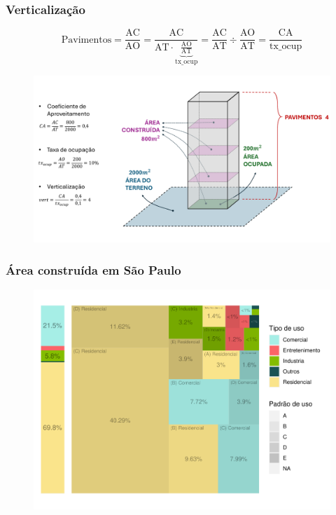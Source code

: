 \documentclass[%
    9pt, 
    aspectratio=169,
]{beamer}
\begin{document}
\begin{frame}
    \frametitle{Verticalização}
    \begin{equation*}
        \text{Pavimentos}=\frac{\text{AC}}{\text{AO}}=\frac{\text{AC}}{\text{AT}\cdot\underbrace{\frac{\text{AO}}{\text{AT}}}_\text{tx\_ocup}}=\frac{\text{AC}}{\text{AT}}\div\frac{\text{AO}}{\text{AT}}=\frac{\text{CA}}{\text{tx\_ocup}}
    \end{equation*}
    \begin{figure}
        \centering
        \includegraphics[height = .6\textheight]{imagens/desenho.pdf}
    \end{figure}
\end{frame}

\begin{frame}
    \frametitle{Área construída em São Paulo}
    \begin{figure}
        \centering
        \includegraphics[height = .95\textheight]{imagens/tree_area_construida.pdf}
    \end{figure}
\end{frame}
\end{document}
